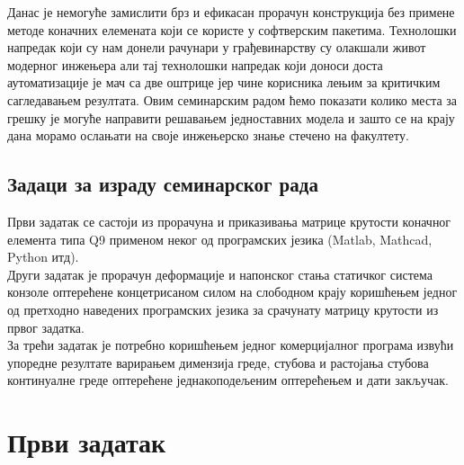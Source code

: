 \documentclass[11pt, a4paper]{article}
\begin{document}
Данас је немогуће замислити брз и ефикасан прорачун конструкција без примене методе коначних елемената који се користе у софтверским пакетима. Технолошки напредак који су нам донели рачунари у грађевинарству су олакшали живот модерног инжењера али тај технолошки напредак који доноси доста аутоматизације је мач са две оштрице јер чине корисника лењим за критичким сагледавањем резултата. Овим семинарским радом ћемо показати колико места за грешку је могуће направити решавањем једноставних модела и зашто се на крају дана морамо ослањати на своје инжењерско знање стечено на факултету. 
\subsection{Задаци за израду семинарског рада}
Први задатак се састоји из прорачуна и приказивања матрице крутости коначног елемента типа Q9 применом неког од програмских језика (Matlab, Mathcad, Python итд).\\
Други задатак је прорачун деформације и напонског стања статичког система конзоле оптерећене концетрисаном силом на слободном крају коришћењем једног од претходно наведених програмских језика за срачунату матрицу крутости из првог задатка.\\
За трећи задатак је потребно коришћењем једног комерцијалног програма извући упоредне резултате варирањем димензија греде, стубова и растојања стубова континуалне греде оптерећене једнакоподељеним оптерећењем и дати закључак.
\newpage
\section{Први задатак}
\end{document}
